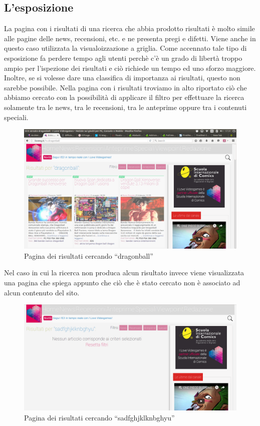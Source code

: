 \documentclass[../ProgettoTecWeb2.tex]{subfiles}
\begin{document}
	\subsection{L'esposizione}
	La pagina con i risultati di una ricerca che abbia prodotto risultati è molto simile alle pagine delle news, recensioni, etc. e ne presenta pregi e difetti. 
	Viene anche in questo caso utilizzata la visualoizzazione a griglia. Come accennato tale tipo di esposizione fa perdere tempo agli utenti perchè c'è un grado di libertà troppo ampio per l'ispezione dei risultati e ciò richiede un tempo ed uno sforzo maggiore. Inoltre, se si volesse dare una classifica di importanza ai risultati, questo non sarebbe possibile.
	Nella pagina con i risultati troviamo in alto riportato ciò che abbiamo cercato con la possibilità di applicare il filtro per effettuare la ricerca solamente tra le news, tra le recensioni, tra le anteprime oppure tra i contenuti speciali.
	\begin{figure} [H]
		\centering
		\includegraphics[scale=0.2]{img/RicercaConRisultati}
		\caption{Pagina dei risultati cercando ``dragonball''}
	\end{figure}

	Nel caso in cui la ricerca non produca alcun risultato invece viene visualizzata una pagina che spiega appunto che ciò che è stato cercato non è associato ad alcun contenuto del sito.
	\begin{figure} [H]
		\centering
		\includegraphics[scale=0.2]{img/RicercaNoRisultati}
		\caption{Pagina dei risultati cercando ``sadfghjklknbghyu''}
	\end{figure}
\end{document}
